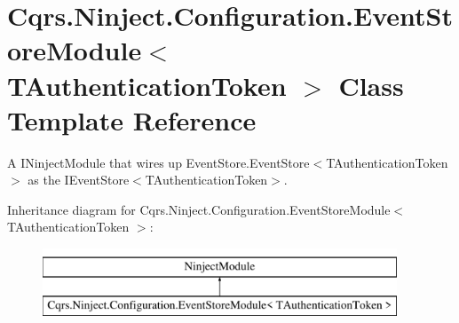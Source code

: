 \hypertarget{classCqrs_1_1Ninject_1_1Configuration_1_1EventStoreModule}{}\section{Cqrs.\+Ninject.\+Configuration.\+Event\+Store\+Module$<$ T\+Authentication\+Token $>$ Class Template Reference}
\label{classCqrs_1_1Ninject_1_1Configuration_1_1EventStoreModule}


A I\+Ninject\+Module that wires up Event\+Store.\+Event\+Store$<$\+T\+Authentication\+Token$>$ as the I\+Event\+Store$<$\+T\+Authentication\+Token$>$.  


Inheritance diagram for Cqrs.\+Ninject.\+Configuration.\+Event\+Store\+Module$<$ T\+Authentication\+Token $>$\+:\begin{figure}[H]
\begin{center}
\leavevmode
\includegraphics[height=2.000000cm]{classCqrs_1_1Ninject_1_1Configuration_1_1EventStoreModule}
\end{center}
\end{figure}
